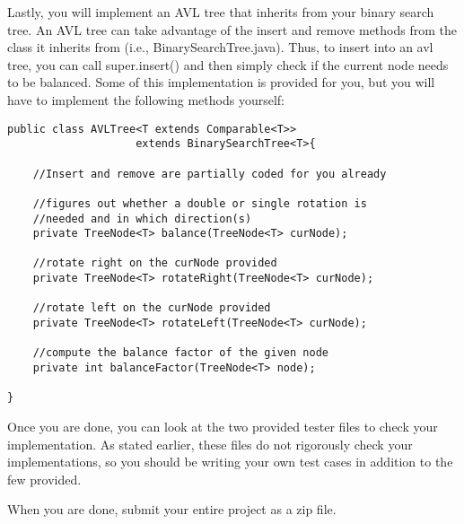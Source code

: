 \documentclass[paper=a4, fontsize=11pt, parskip=full]{scrartcl} %
\numberwithin{equation}{section} %
\numberwithin{figure}{section} %
\numberwithin{table}{section} %
\begin{document}
Lastly, you will implement an AVL tree that inherits from your binary search tree. An AVL tree can take advantage of the insert and remove methods from the class it inherits from (i.e., BinarySearchTree.java). Thus, to insert into an avl tree, you can call super.insert() and then simply check if the current node needs to be balanced. Some of this implementation is provided for you, but you will have to implement the following methods yourself:

\begin{lstlisting}
public class AVLTree<T extends Comparable<T>>
					extends BinarySearchTree<T>{

	//Insert and remove are partially coded for you already

	//figures out whether a double or single rotation is
	//needed and in which direction(s)
	private TreeNode<T> balance(TreeNode<T> curNode);
			
	//rotate right on the curNode provided
	private TreeNode<T> rotateRight(TreeNode<T> curNode);
	
	//rotate left on the curNode provided
	private TreeNode<T> rotateLeft(TreeNode<T> curNode);
	
	//compute the balance factor of the given node
	private int balanceFactor(TreeNode<T> node);

}
\end{lstlisting}

Once you are done, you can look at the two provided tester files to check your implementation. As stated earlier, these files do not rigorously check your implementations, so you should be writing your own test cases in addition to the few provided.

When you are done, submit your entire project as a zip file.



\end{document}

